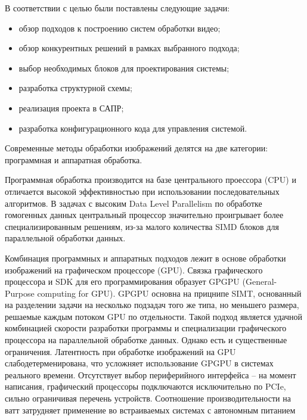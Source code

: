 В соответствии с целью были поставлены следующие задачи:
\begin{itemize}
  \item обзор подходов к построению систем обработки видео;
  \item обзор конкурентных решений в рамках выбранного подхода;
  \item выбор необходимых блоков для проектирования системы;
  \item разработка структурной схемы;
  \item реализация проекта в САПР;
  \item разработка конфигурационного кода для управления системой.
\end{itemize}



Современные методы обработки изображений делятся на две категории: программная и аппаратная обработка.

Программная обработка производится на базе центрального проессора (CPU) и отличается высокой эффективностью
при использовании последовательных алгоритмов. В задачах с высоким Data Level Parallelism по обработке гомогенных данных
центральный процессор значительно проигрывает более специализированным решениям,
из-за малого количества SIMD блоков для параллельной обработки данных.

Комбинация программных и аппаратных подходов лежит в основе обработки изображений на графическом процессоре (GPU).
Связка графического процессора и SDK для его программирования образует GPGPU (General-Purpose computing for GPU).
GPGPU основна на прицнипе SIMT, основанный на разделении задачи на несколько подзадач того же типа, но меньшего размера,
решаемые каждым потоком GPU по отдельности.
Такой подход является удачной комбинацией скорости разработки программы и специализации графического процессора
на параллельной обработке данных.
Однако есть и существенные ограничения.
Латентность при обработке изображений на GPU слабодетерменирована, что усложняет использование GPGPU
в системах реального времени. %
Отсутствует выбор периферийного интерфейса -- на момент написания,
графический процессоры подключаются исключительно по PCIe, сильно ограничивая перечень устройств.
Соотношение производительности на ватт затрудняет применение во встраиваемых системах с автономным питанием %

